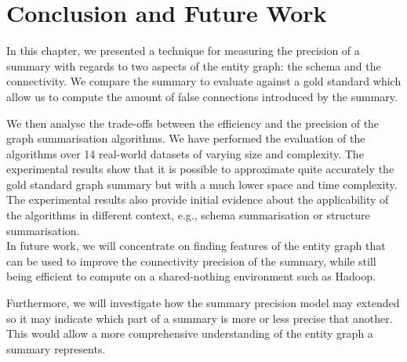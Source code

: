 \section{Conclusion and Future Work}

In this chapter, we presented a technique for measuring the precision of a summary with regards to two aspects of the entity graph: the schema and the connectivity. We compare the summary to evaluate against a gold standard which allow us to compute the amount of false connections introduced by the summary.

We then analyse the trade-offs between the efficiency and the precision of the graph summarisation algorithms. We have performed the evaluation of the algorithms over 14 real-world datasets of varying size and complexity. The experimental results show that it is possible to approximate quite accurately the gold standard graph summary but with a much lower space and time complexity. The experimental results also provide initial evidence about the applicability of the algorithms in different context, e.g., schema summarisation or structure summarisation.\\

In future work, we will concentrate on finding features of the entity graph that can be used to improve the connectivity precision of the summary, while still being efficient to compute on a shared-nothing environment such as Hadoop.

Furthermore, we will investigate how the summary precision model may extended so it may indicate which part of a summary is more or less precise that another. This would allow a more comprehensive understanding of the entity graph a summary represents.
